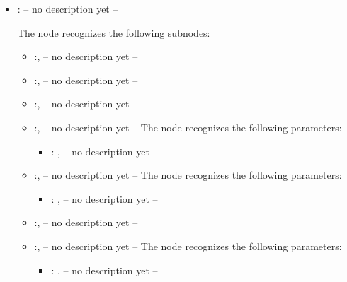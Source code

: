 \begin{itemize}
    \item {}:
      -- no description yet --

      The  node recognizes the following subnodes:
      \begin{itemize}
        \item {}:, 
          -- no description yet --

        \item {}:, 
          -- no description yet --

        \item {}:, 
          -- no description yet --

        \item {}:, 
          -- no description yet --
          The  node recognizes the following parameters:
            \begin{itemize}
              \item {}: , 
                -- no description yet --
          \end{itemize}

        \item {}:, 
          -- no description yet --
          The  node recognizes the following parameters:
            \begin{itemize}
              \item {}: , 
                -- no description yet --
          \end{itemize}

        \item {}:, 
          -- no description yet --

        \item {}:, 
          -- no description yet --
          The  node recognizes the following parameters:
            \begin{itemize}
              \item {}: , 
                -- no description yet --
          \end{itemize}
      \end{itemize}


\end{itemize}
